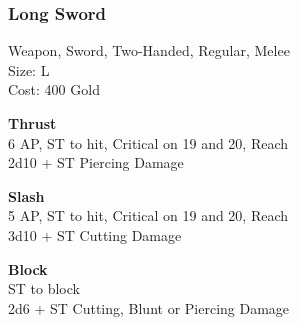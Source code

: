 \subsubsection{Long Sword}\label{weapon:longSword}
Weapon, Sword, Two-Handed, Regular, Melee\\
Size: L\\
Cost: 400 Gold

\textbf{Thrust}\\
6 AP, ST to hit, Critical on 19 and 20,  Reach\\
2d10 + \texttimes ST Piercing Damage

\textbf{Slash}\\
5 AP, ST to hit, Critical on 19 and 20,  Reach\\
3d10 + \texttimes ST Cutting Damage

\textbf{Block}\\
ST to block\\
2d6 + \texttimes ST Cutting, Blunt or Piercing Damage
